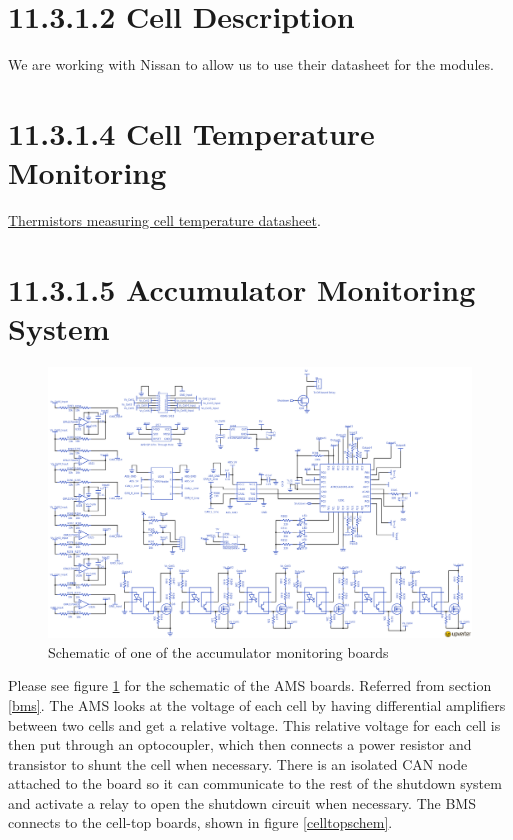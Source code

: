 \documentclass{article}
\begin{document}
\section*{11.3.1.2 Cell Description}
We are working with Nissan to allow us to use their datasheet for the modules. 

\section*{11.3.1.4 Cell Temperature Monitoring}

\href{http://media.digikey.com/PDF/Data\%20Sheets/Ametherm\%20PDFs/PANR\%20103395-408.pdf}{Thermistors measuring cell temperature datasheet}.

\section*{11.3.1.5 Accumulator Monitoring System}  \label{amsappendix}

\begin{figure}
    \centering
    \includegraphics[width = 1 \textwidth]{BMS_Schem}
    \caption{Schematic of one of the accumulator monitoring boards}
    \label{amsschem}
\end{figure}

Please see figure \ref{amsschem} for the schematic of the AMS boards. Referred from section \ref{bms}. The AMS looks at the voltage of each cell by having differential amplifiers between two cells and get a relative voltage. This relative voltage for each cell is then put through an optocoupler, which then connects a power resistor and transistor to shunt the cell when necessary. There is an isolated CAN node attached to the board so it can communicate to the rest of the shutdown system and activate a relay to open the shutdown circuit when necessary. The BMS connects to the cell-top boards, shown in figure \ref{celltopschem}.
            
\end{document}
